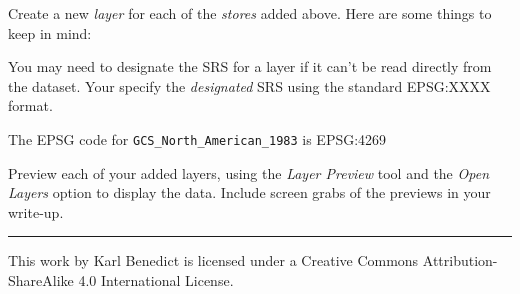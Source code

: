 \documentclass[]{book}
\providecommand{\tightlist}{%
  \setlength{\itemsep}{0pt}\setlength{\parskip}{0pt}}
\begin{document}
Create a new \emph{layer} for each of the \emph{stores} added above.
Here are some things to keep in mind:

You may need to designate the SRS for a layer if it can't be read
directly from the dataset. Your specify the \emph{designated} SRS using
the standard EPSG:XXXX format.

The EPSG code for \texttt{GCS\_North\_American\_1983} is EPSG:4269

\begin{description}
\tightlist
\item[Question 3]
Preview each of your added layers, using the \emph{Layer Preview} tool
and the \emph{Open Layers} option to display the data. Include screen
grabs of the previews in your write-up.
\end{description}

\begin{center}\rule{0.5\linewidth}{\linethickness}\end{center}

This work by {Karl Benedict} is licensed under a Creative Commons
Attribution-ShareAlike 4.0 International License.
\end{document}
